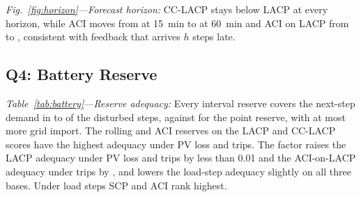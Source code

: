 \documentclass[conference,a4paper]{IEEEtran}
\begin{document}
\emph{Fig.~\ref{fig:horizon}---Forecast horizon:} CC-LACP stays below LACP at every horizon,
while ACI moves from \hzACIShort{} at 15~min to \hzACILong{} at 60~min and ACI on LACP from \hzACILShort{} to
\hzACILLong, consistent with feedback that arrives $h$ steps late.

\subsection{Q4: Battery Reserve}
\begin{table}[t]
\caption{Battery reserve at the 15-min horizon: reserve adequacy, shortfall (uncovered next-step energy) and
grid import (kWh per event). Bold: best interval reserve.}
\label{tab:battery}
\centering
\scriptsize
\setlength{\tabcolsep}{2pt}
\renewcommand{\arraystretch}{0.95}
\end{table}

\emph{Table~\ref{tab:battery}---Reserve adequacy:} Every interval reserve covers the next-step demand in
\batAdqIntMin{} to \batAdqIntMax{} of the disturbed steps, against \batAdqPoint{} for the point reserve, with at
most \batImpRise{} more grid import. The rolling and ACI reserves on the LACP and CC-LACP scores have the highest
adequacy under PV loss and trips. The factor raises the LACP adequacy under PV loss and trips by less than 0.01 and
the ACI-on-LACP adequacy under trips by \batTripAdqACICCLvsACILAbs, and lowers the load-step adequacy slightly on
all three bases. Under load steps SCP and ACI rank highest.
\end{document}
